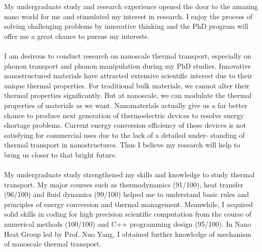 \documentclass[a4paper,10pt]{article}
\begin{document}
\begin{spacing}{1.5}
\vspace{0.5em}
My undergraduate study and research experience opened the door to the amazing nano world for me and stimulated my interest in research. I enjoy the process of solving challenging problems by innovative thinking and the PhD program will offer me a great chance to pursue my interests.\\
\\
I am desirous to conduct research on nanoscale thermal transport, especially on phonon transport and phonon manipulation during my PhD studies. Innovative nanostructured materials have attracted extensive scientific interest due to their unique thermal properties. For traditional bulk materials, we cannot alter their thermal properties significantly. But at nanoscale, we can modulate the thermal properties of materials as we want. Nanomaterials actually give us a far better chance to produce next generation of thermoelectric devices to resolve energy shortage problems. Current energy conversion efficiency of these devices is not satisfying for commercial uses due to the lack of a detailed under- standing of thermal transport in nanostructures. Thus I believe my research will help to bring us closer to that bright future.\\
\\
My undergraduate study strengthened my skills and knowledge to study thermal transport. My major courses such as thermodynamics (91/100), heat transfer (96/100) and fluid dynamics (99/100) helped me to understand basic rules and principles of energy conversion and thermal management. Meanwhile, I acquired solid skills in coding for high precision scientific computation from the course of numerical methods (100/100) and C++ programming design (95/100). In Nano Heat Group led by Prof. Nuo Yang, I obtained further knowledge of mechanism of nanoscale thermal transport.\\
\\

\end{spacing}
\end{document}
